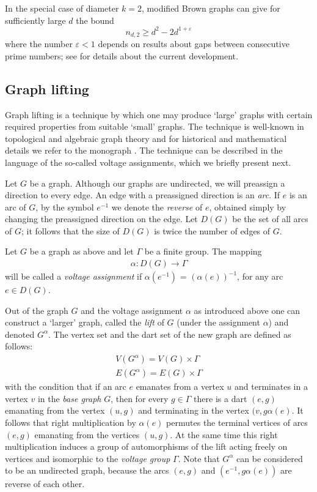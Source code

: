 \documentclass[a4paper,12pt,oneside]{report}%
\begin{document}
In the special case of diameter $k=2$, modified Brown graphs can give for sufficiently large $d$ the bound
\begin{equation*}
	n_{d,2} \geq d^{2} - 2d^{1+\varepsilon}
\end{equation*}	
where the number $\varepsilon < 1$ depends on results about gaps between consecutive prime numbers; see \cite{Bev-Ers} for details about the current development.

\subsection{Graph lifting}
Graph lifting is a technique by which one may produce `large' graphs with certain required properties from suitable `small' graphs. The technique is well-known in topological and algebraic graph theory and for historical and mathematical details we refer to the monograph \cite{Gro-Tuc}. The technique can be described in the language of the so-called voltage assignments, which we briefly present next.
\medskip

Let $G$ be a graph. Although our graphs are undirected, we will preassign a direction to every edge. An edge with a preassigned direction is an {\em arc}. If $e$ is an arc of $G$, by the symbol $e^{-1}$ we denote the {\em reverse} of $e$, obtained simply by changing the preassigned direction on the edge. Let $D(G)$ be the set of all arcs of $G$; it follows that the size of $D(G)$ is twice the number of edges of $G$.
\medskip

Let $G$ be a graph as above and let $\Gamma$ be a finite group. The mapping
\begin{align*}
	\alpha: D(G) \rightarrow \Gamma
\end{align*}	
will be called a {\em voltage assignment} if $\alpha(e^{-1})$ = $(\alpha(e))^{-1}$, for any arc $e \in D(G)$.
\medskip

Out of the graph $G$ and the voltage assignment $\alpha$ as introduced above one can construct a `larger' graph, called the {\em lift} of $G$ (under the assignment $\alpha$) and denoted $G^{\alpha}$. The vertex set and the dart set of the new graph are defined as follows:
\begin{align*}
	V(G^{\alpha}) = V(G) \times \Gamma \\
	E(G^{\alpha}) = E(G) \times \Gamma
\end{align*}	
with the condition that if an arc $e$ emanates from a vertex $u$ and terminates in a vertex $v$ in the {\em base graph} $G$, then for every $g\in \Gamma$ there is a dart $(e,g)$ emanating from the vertex $(u,g)$ and terminating in the vertex $(v,g\alpha(e)$. It follows that right multiplication by $\alpha(e)$ permutes the terminal vertices of arcs $(e,g)$ emanating from the vertices $(u,g)$. At the same time this right multiplication induces a group of automorphisms of the lift acting freely on vertices and isomorphic to the {\em voltage group} $\Gamma$. Note that $G^{\alpha}$ can be considered to be an undirected graph, because the arcs $(e,g)$ and $(e^{-1},g\alpha(e))$ are reverse of each other.    \medskip
\end{document}
